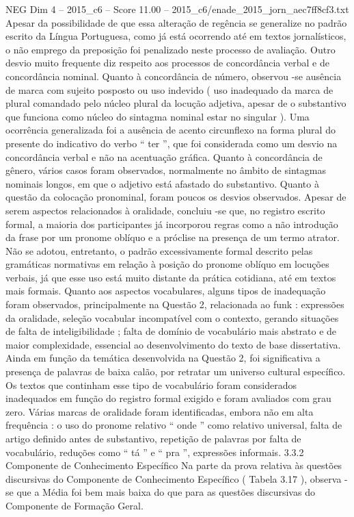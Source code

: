 \begin{textsample}{NEG Dim 4 – 2015\_c6 – Score 11.00 – 2015\_c6/enade\_2015\_jorn\_aec7ff8cf3.txt}
Apesar da possibilidade de que essa alteração de regência se generalize no padrão escrito da Língua Portuguesa, como já está ocorrendo até em textos jornalísticos, o não emprego da preposição foi penalizado neste processo de avaliação.
Outro desvio muito frequente diz respeito aos processos de concordância verbal e de concordância nominal.
Quanto à concordância de número, observou -se ausência de marca com sujeito posposto ou uso indevido ( uso inadequado da marca de plural comandado pelo núcleo plural da locução adjetiva, apesar de o substantivo que funciona como núcleo do sintagma nominal estar no singular ).
Uma ocorrência generalizada foi a ausência de acento circunflexo na forma plural do presente do indicativo do verbo “ ter ”, que foi considerada como um desvio na concordância verbal e não na acentuação gráfica.
Quanto à concordância de gênero, vários casos foram observados, normalmente no âmbito de sintagmas nominais longos, em que o adjetivo está afastado do substantivo.
Quanto à questão da colocação pronominal, foram poucos os desvios observados.
Apesar de serem aspectos relacionados à oralidade, concluiu -se que, no registro escrito formal, a maioria dos participantes já incorporou regras como a não introdução da frase por um pronome oblíquo e a próclise na presença de um termo atrator.
Não se adotou, entretanto, o padrão excessivamente formal descrito pelas gramáticas normativas em relação à posição do pronome oblíquo em locuções verbais, já que esse uso está muito distante da prática cotidiana, até em textos mais formais.
Quanto aos aspectos vocabulares, alguns tipos de inadequação foram observados, principalmente na Questão 2, relacionada ao funk : expressões da oralidade, seleção vocabular incompatível com o contexto, gerando situações de falta de inteligibilidade ; falta de domínio de vocabulário mais abstrato e de maior complexidade, essencial ao desenvolvimento do texto de base dissertativa.
Ainda em função da temática desenvolvida na Questão 2, foi significativa a presença de palavras de baixa calão, por retratar um universo cultural específico.
Os textos que continham esse tipo de vocabulário foram considerados inadequados em função do registro formal exigido e foram avaliados com grau zero.
Várias marcas de oralidade foram identificadas, embora não em alta frequência : o uso do pronome relativo “ onde ” como relativo universal, falta de artigo definido antes de substantivo, repetição de palavras por falta de vocabulário, reduções como “ tá ” e “ pra ”, expressões informais. 3.3.2 Componente de Conhecimento Específico Na parte da prova relativa às questões discursivas do Componente de Conhecimento Específico ( Tabela 3.17 ), observa -se que a Média foi bem mais baixa do que para as questões discursivas do Componente de Formação Geral.

\end{textsample}
